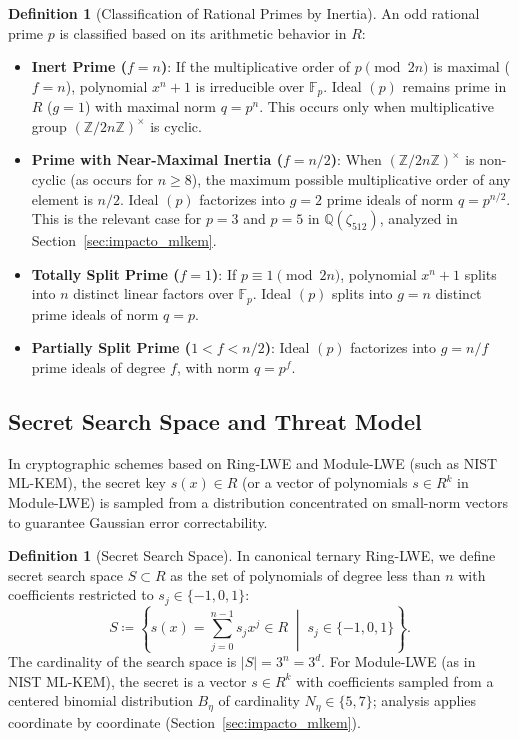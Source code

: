 \documentclass[11pt,a4paper]{article}
\theoremstyle{plain}
\theoremstyle{definition}
\newtheorem{definicion}[teorema]{Definition}
\numberwithin{equation}{section}
\newcommand{\QQ}{\mathbb{Q}}
\newcommand{\ZZ}{\mathbb{Z}}
\newcommand{\FF}{\mathbb{F}}
\begin{document}
\begin{definicion}[Classification of Rational Primes by Inertia]
An odd rational prime $p$ is classified based on its arithmetic behavior in $R$:
\begin{itemize}
    \item \textbf{Inert Prime ($f = n$)}: If the multiplicative order of $p \pmod{2n}$ is maximal ($f = n$), polynomial $x^n + 1$ is irreducible over $\FF_p$. Ideal $(p)$ remains prime in $R$ ($g = 1$) with maximal norm $q = p^n$. This occurs only when multiplicative group $(\ZZ/2n\ZZ)^\times$ is cyclic.
    \item \textbf{Prime with Near-Maximal Inertia ($f = n/2$)}: When $(\ZZ/2n\ZZ)^\times$ is non-cyclic (as occurs for $n \ge 8$), the maximum possible multiplicative order of any element is $n/2$. Ideal $(p)$ factorizes into $g = 2$ prime ideals of norm $q = p^{n/2}$. This is the relevant case for $p = 3$ and $p = 5$ in $\QQ(\zeta_{512})$, analyzed in Section~\ref{sec:impacto_mlkem}.
    \item \textbf{Totally Split Prime ($f = 1$)}: If $p \equiv 1 \pmod{2n}$, polynomial $x^n + 1$ splits into $n$ distinct linear factors over $\FF_p$. Ideal $(p)$ splits into $g = n$ distinct prime ideals of norm $q = p$.
    \item \textbf{Partially Split Prime ($1 < f < n/2$)}: Ideal $(p)$ factorizes into $g = n/f$ prime ideals of degree $f$, with norm $q = p^f$.
\end{itemize}
\end{definicion}

\subsection{Secret Search Space and Threat Model}

In cryptographic schemes based on Ring-LWE and Module-LWE (such as NIST ML-KEM), the secret key $s(x) \in R$ (or a vector of polynomials $s \in R^k$ in Module-LWE) is sampled from a distribution concentrated on small-norm vectors to guarantee Gaussian error correctability.

\begin{definicion}[Secret Search Space]
\label{def:espacio_busqueda}
In canonical ternary Ring-LWE, we define secret search space $S \subset R$ as the set of polynomials of degree less than $n$ with coefficients restricted to $s_j \in \{-1, 0, 1\}$:
\begin{equation}
S \coloneqq \left\{ s(x) = \sum_{j=0}^{n-1} s_j x^j \in R \;\middle|\; s_j \in \{-1, 0, 1\} \right\}.
\end{equation}
The cardinality of the search space is $|S| = 3^n = 3^d$. For Module-LWE (as in NIST ML-KEM), the secret is a vector $s \in R^k$ with coefficients sampled from a centered binomial distribution $B_\eta$ of cardinality $N_\eta \in \{5, 7\}$; analysis applies coordinate by coordinate (Section~\ref{sec:impacto_mlkem}).
\end{definicion}
\end{document}
